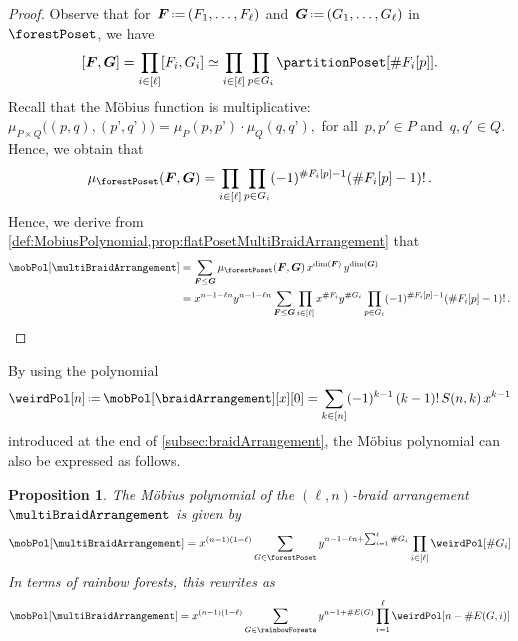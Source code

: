\documentclass{amsart}
\newtheorem{proposition}[theorem]{Proposition}
\theoremstyle{definition}
\renewcommand{\b}[1]{{\boldsymbol{#1}}} %
\newcommand{\eqdef}{\mbox{\,\raisebox{0.2ex}{\scriptsize\ensuremath{\mathrm:}}\ensuremath{=}\,}} %
\renewcommand{\b}[1]{\boldsymbol{#1}} %
\begin{document}
\begin{proof}
Observe that for~$\b{F} \eqdef (F_1, \dots, F_\ell)$ and~$\b{G} \eqdef (G_1, \dots, G_\ell)$ in~$\forestPoset$, we have
\[
[\b{F}, \b{G}] = \prod_{i \in [\ell]} [F_i, G_i] \simeq \prod_{i \in [\ell]} \prod_{p \in G_i} \partitionPoset[{\#F_i[p]}].
\]
Recall that the M\"obius function is multiplicative:
\(
\mu_{P \times Q} \big( (p,q), (p’,q’) \big) = \mu_P(p,p’) \cdot \mu_Q(q,q’),
\)
for all~$p, p' \in P$ and~$q, q' \in Q$.
Hence, we obtain that
\[
\mu_{\forestPoset}(\b{F}, \b{G}) = \prod_{i \in [\ell]} \prod_{p \in G_i} (-1)^{\#F_i[p]-1} (\# F_i[p]-1)! \, .
\]
Hence, we derive from \cref{def:MobiusPolynomial,prop:flatPosetMultiBraidArrangement} that
\begin{align*}
\mobPol[\multiBraidArrangement] 
& = \sum_{\b{F} \le \b{G}} \mu_{\forestPoset}(\b{F}, \b{G}) \, x^{\dim(\b{F})} \, y^{\dim(\b{G})} \\
& = x^{n-1-\ell n} y^{n-1-\ell n} \sum_{\b{F} \le \b{G}} \prod_{i \in [\ell]} x^{\#F_i} y^{\#G_i} \prod_{p \in G_i} (-1)^{\#F_i[p]-1} (\# F_i[p]-1)! \, .
\qedhere
\end{align*}
\end{proof}

By using the polynomial
\[
\weirdPol[n] \eqdef \mobPol[\braidArrangement][x][0] = \sum_{k \in [n]} (-1)^{k-1} \, (k-1)! \, S(n,k) \, x^{k-1}
\]
introduced at the end of \cref{subsec:braidArrangement}, the M\"obius polynomial can also be expressed as follows.

\begin{proposition} 
The M\"obius polynomial of the $(\ell,n)$-braid arrangement~$\multiBraidArrangement$ is given by
\[
\mobPol[\multiBraidArrangement] = x^{(n-1)(1-\ell)} \sum_{G \in \forestPoset} y^{n-1-\ell n+\sum_{i=1}^\ell \#G_i}  \prod_{i \in [\ell]} \weirdPol[\#G_i]
\]
In terms of rainbow forests, this rewrites as
\[
\mobPol[\multiBraidArrangement] = x^{(n-1)(1-\ell)} \sum_{G \in \rainbowForests} y^{n-1+\#E(G)}  \prod_{i=1}^{\ell} \weirdPol[n-\#E(G,i)]
\]
\end{proposition}
\end{document}
